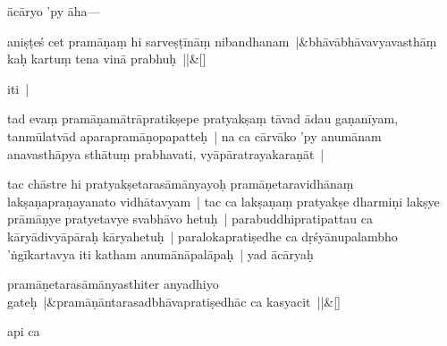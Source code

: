 \documentclass[article,12pt,a4paper]{memoir}%
\newcommand{\persName}[1]{#1}
\newcounter{parCount}
\begin{document}
	  
	  

	  
	  \pstart \leavevmode%
	\persName{ācāryo} 'py āha—
	{}
	\pend%
      
	    
	    \stanza[\smallbreak]
	  aniṣṭeś cet pramāṇaṃ hi sarveṣṭīnāṃ nibandhanam |&bhāvābhāvavyavasthāṃ kaḥ kartuṃ tena vinā prabhuḥ ||\&[\smallbreak]
	  
	  
	  

	  
	  \pstart \leavevmode%
	iti |
	{}
	\pend%
      

	  
	  \pstart \leavevmode%
	\label{thakur75-96.26}tad evaṃ pramāṇamātrāpratikṣepe pratyakṣaṃ tāvad ādau gaṇanīyam, tanmūlatvād aparapramāṇopapatteḥ | na ca cārvāko 'py anumānam anavasthāpya sthātuṃ prabhavati, vyāpāratrayakaraṇāt | 
	{}
	\pend%
      

	  
	  \pstart \leavevmode%
	\label{thakur75-97.1}tac chāstre hi pratyakṣetarasāmānyayoḥ pramāṇetaravidhānaṃ lakṣaṇapraṇayanato vidhātavyam | tac ca lakṣaṇaṃ pratyakṣe dharmiṇi lakṣye prāmāṇye pratyetavye svabhāvo hetuḥ | parabuddhipratipattau ca kāryādivyāpāraḥ kāryahetuḥ | paralokapratiṣedhe ca dṛśyānupalambho 'ṅgīkartavya iti katham anumānāpalāpaḥ | yad ācāryaḥ 
	{}
	\pend%
      
	    
	    \stanza[\smallbreak]
	  pramāṇetarasāmānyasthiter anyadhiyo gateḥ |&pramāṇāntarasadbhāvapratiṣedhāc ca kasyacit ||\&[\smallbreak]
	  
	  
	  

	  
	  \pstart \leavevmode%
	api ca
	{}
	\pend%
      
\end{document}
